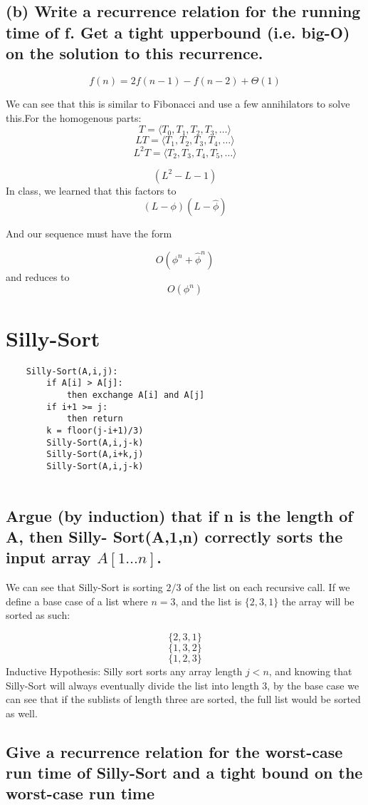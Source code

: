 \documentclass[titlepage]{article}\usepackage[]{graphicx}\usepackage[]{color}
\begin{document}
\subsection{(b) Write a recurrence relation for the running time of f. Get a tight
upperbound (i.e. big-O) on the solution to this recurrence.}

\[ f(n) = 2f(n-1) - f(n-2) + \Theta(1) \]

We can see that this is similar to Fibonacci and use a few annihilators to
solve this.For the homogenous parts:
\[ T = \langle T_0, T_1, T_2, T_3, \ldots \rangle \]
\[ LT = \langle T_1, T_2, T_3, T_4, \ldots \rangle \]
\[ L^2T = \langle T_2, T_3, T_4, T_5, \ldots \rangle \]

\[ (L^2 - L - 1) \] 
In class, we learned that this factors to \[ (L	 - \phi)(L - \hat{\phi} ) \]

And our sequence must have the form 

\[ O(\phi^n + \hat{\phi}^n) \]
and reduces to 
\[ O(\phi^n) \]
\section{Silly-Sort }
\begin{lstlisting}
	Silly-Sort(A,i,j):
		if A[i] > A[j]:
			then exchange A[i] and A[j]
		if i+1 >= j:
			then return
		k = floor(j-i+1)/3)
		Silly-Sort(A,i,j-k)
		Silly-Sort(A,i+k,j)
		Silly-Sort(A,i,j-k)
	
\end{lstlisting}

\subsection{ Argue (by induction) that if n is the
length of A, then Silly- Sort(A,1,n)
correctly sorts the input array
$A[1\dots n]$.}

We can see that Silly-Sort is sorting $2/3$ of the list on each recursive call.
If we define a base case of a list where $n=3$, and the list is $\{ 2,3,1 \} $ the array will be sorted as
such:

\[ \{ 2, 3, 1 \} \] 
  \[ \{ 1, 3, 2 \} \]
  \[ \{ 1, 2, 3 \} \]
Inductive Hypothesis: Silly sort sorts any array length $j<n$, and knowing that
Silly-Sort will always eventually divide the list into length 3, by the base
case we can see that if the sublists of length three are sorted, the full list
would be sorted as well. 


\subsection{ Give a recurrence relation for the worst-case run time of Silly-Sort and a
tight bound on the worst-case run time}
\end{document}
